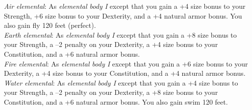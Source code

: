 \textit{Air elemental}: As \textit{elemental body I} except that you gain a +4 size bonus to your Strength, +6 size bonus to your Dexterity, and a +4 natural armor bonus. You also gain fly 120 feet (perfect).\\
\textit{Earth elemental}: As \textit{elemental body I} except that you gain a +8 size bonus to your Strength, a --2 penalty on your Dexterity, a +4 size bonus to your Constitution, and a +6 natural armor bonus. \\
\textit{Fire elemental}: As \textit{elemental body I} except that you gain a +6 size bonus to your Dexterity, a +4 size bonus to your Constitution, and a +4 natural armor bonus.\\
\textit{Water elemental}: As \textit{elemental body I} except that you gain a +4 size bonus to your Strength, a --2 penalty on your Dexterity, a +8 size bonus to your Constitution, and a +6 natural armor bonus. You also gain swim 120 feet.\\
